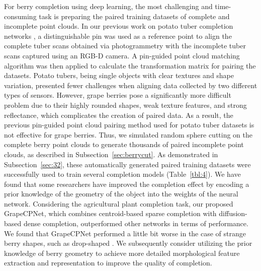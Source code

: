 \documentclass[12pt]{article}
\begin{document}
For berry completion using deep learning, the most challenging and time-consuming task is preparing the paired training datasets of complete and incomplete point clouds.
In our previous work on potato tuber completion networks \citep{blok_highthroughput_2025}, a distinguishable pin was used as a reference point to align the complete tuber scans obtained via photogrammetry with the incomplete tuber scans captured using an RGB-D camera.
A pin-guided point cloud matching algorithm was then applied to calculate the transformation matrix for pairing the datasets.
Potato tubers, being single objects with clear textures and shape variation, presented fewer challenges when aligning data collected by two different types of sensors.
However, grape berries pose a significantly more difficult problem due to their highly rounded shapes, weak texture features, and strong reflectance, which complicates the creation of paired data.
As a result, the previous pin-guided point cloud pairing method used for potato tuber datasets is not effective for grape berries.
Thus, we simulated random sphere cutting on the complete berry point clouds to generate thousands of paired incomplete point clouds, as described in Subsection~\ref{sec:berrycut}.
As demonstrated in Subsection~\ref{sec:32}, these automatically generated paired training datasets were successfully used to train several completion models (Table~\ref{tbl:4}).
We have found that some researchers \citep{pan_panoptic_2023,magistri_efficient_2024} have improved the completion effect by encoding a prior knowledge of the geometry of the object into the weights of the neural network. 
Considering the agricultural plant completion task, our proposed GrapeCPNet, which combines centroid-based sparse completion with diffusion-based dense completion, outperformed other networks in terms of performance.
We found that GrapeCPNet performed a little bit worse in the case of strange berry shapes, such as drop-shaped .
We subsequently consider utilizing the prior knowledge of berry geometry to achieve more detailed morphological feature extraction and representation to improve the quality of completion. 
\end{document}
